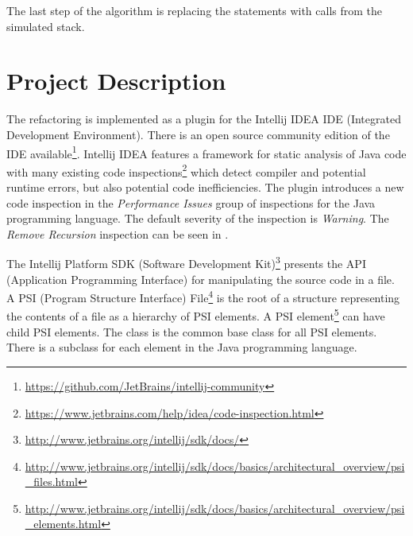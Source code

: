 The last step of the algorithm is replacing the  statements with  calls from the simulated stack.

\nocite{llvm}
\nocite{cfg}

\section{Project Description}

The refactoring is implemented as a plugin for the Intellij IDEA IDE (Integrated Development Environment).
 There is an open source community edition of the IDE
available\footnote{\url{https://github.com/JetBrains/intellij-community}}. Intellij IDEA features a framework for
static analysis of Java code with many existing code
inspections\footnote{\url{https://www.jetbrains.com/help/idea/code-inspection.html}} which detect compiler and potential
runtime errors, but also potential code inefficiencies. The plugin introduces a new code inspection in the
\textit{Performance Issues} group of inspections for the Java programming language. The default severity of the inspection is
\textit{Warning}. The \textit{Remove Recursion} inspection can be seen in .

The Intellij Platform SDK (Software Development Kit)\footnote{\url{http://www.jetbrains.org/intellij/sdk/docs/}}
presents the API (Application Programming Interface) for manipulating
the source code in a file. A PSI (Program Structure Interface)
File\footnote{\url{http://www.jetbrains.org/intellij/sdk/docs/basics/architectural_overview/psi_files.html}} is the root
of a structure representing the contents of a file as a hierarchy of PSI elements. A PSI
element\footnote{\url{http://www.jetbrains.org/intellij/sdk/docs/basics/architectural_overview/psi_elements.html}} can
have child PSI elements. The  class is the common base class for all PSI elements. There is a
 subclass for each element in the Java programming language.


